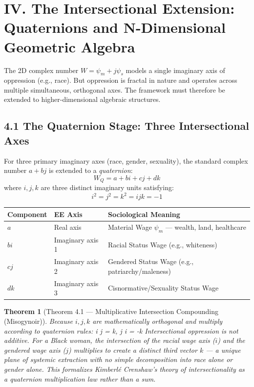 \documentclass[12pt]{book}
\numberwithin{equation}{chapter}
\newtheorem{theorem}{Theorem}[chapter]
\begin{document}
\section{IV. The Intersectional Extension: Quaternions and N-Dimensional Geometric Algebra}

    The 2D complex number $W = \psi_m + j\psi_s$ models a single imaginary axis of oppression (e.g., race). But oppression is fractal in nature and operates across multiple simultaneous, orthogonal axes. The framework must therefore be extended to higher-dimensional algebraic structures.
  

\subsection{4.1 The Quaternion Stage: Three Intersectional Axes}

    For three primary imaginary axes (race, gender, sexuality), the standard complex number $a + bj$ is extended to a \emph{quaternion}:
    \[
      W_{Q} = a + bi + cj + dk
    \]
    where $i, j, k$ are three distinct imaginary units satisfying:
    \[
      i^2 = j^2 = k^2 = ijk = -1
    \]
  

\begin{center}
\begin{tabular}{lll}
\toprule
Component & EE Axis & Sociological Meaning  \\
\midrule
$a$ & Real axis & Material Wage $\psi_m$ — wealth, land, healthcare  \\
$bi$ & Imaginary axis 1 & Racial Status Wage (e.g., whiteness)  \\
$cj$ & Imaginary axis 2 & Gendered Status Wage (e.g., patriarchy/maleness)  \\
$dk$ & Imaginary axis 3 & Cisnormative/Sexuality Status Wage  \\
\bottomrule
\end{tabular}
\end{center}

\begin{theorem}[Theorem 4.1 — Multiplicative Intersection Compounding (Misogynoir)]
Because $i, j, k$ are mathematically orthogonal and multiply according to quaternion rules:
      i \times j = k, \quad j \times i = -k
    Intersectional oppression is \emph{not} additive. For a Black woman, the intersection of the racial wage axis ($i$) and the gendered wage axis ($j$) multiplies to create a distinct third vector $k$ — a unique plane of systemic extraction with no simple decomposition into race alone or gender alone. This formalizes Kimberlé Crenshaw's theory of intersectionality as a quaternion multiplication law rather than a sum.
  \end{theorem}
\end{document}
